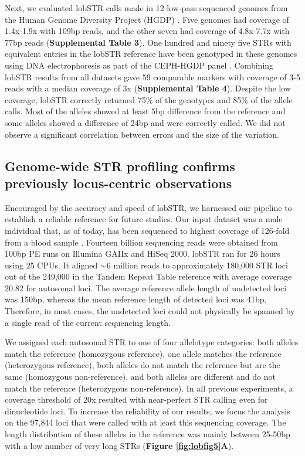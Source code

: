 Next, we evaluated lobSTR calls made in 12 low-pass sequenced genomes from the Human Genome Diversity Project (HGDP) \cite{GreenKrauseBriggsEtAl2010,ReichGreenKircherEtAl2010}. Five genomes had coverage of 1.4x-1.9x with 109bp reads, and the other seven had coverage of 4.8x-7.7x with 77bp reads (\textbf{Supplemental Table 3}). One hundred and ninety five STRs with equivalent entries in the lobSTR reference have been genotyped in these genomes using DNA electrophoresis as part of the CEPH-HGDP panel \cite{RamachandranDeshpandeRosemanEtAl2005,PembertonSandefurJakobssonEtAl2009}. Combining lobSTR results from all datasets gave 59 comparable markers with coverage of 3-5 reads with a median coverage of 3x (\textbf{Supplemental Table 4}). Despite the low coverage, lobSTR correctly returned 75\% of the genotypes and 85\% of the allele calls. Most of the alleles showed at least 5bp difference from the reference and some alleles showed a difference of 24bp and were correctly called. We did not observe a significant correlation between errors and the size of the variation. 

\subsection{Genome-wide STR profiling confirms previously locus-centric observations}
Encouraged by the accuracy and speed of lobSTR, we harnessed our pipeline to establish a reliable reference for future studies. Our input dataset was a male individual that, as of today, has been sequenced to highest coverage of 126-fold from a blood sample \cite{AjayParkerAbaanEtAl2011}. Fourteen billion sequencing reads were obtained from 100bp PE runs on Illumina GAIIx and HiSeq 2000. lobSTR ran for 26 hours using 25 CPUs. It aligned $\sim$6 million reads to approximately 180,000 STR loci out of the 249,000 in the Tandem Repeat Table reference with average coverage 20.82 for autosomal loci. The average reference allele length of undetected loci was 150bp, whereas the mean reference length of detected loci was 41bp. Therefore, in most cases, the undetected loci could not physically be spanned by a single read of the current sequencing length.

We assigned each autosomal STR to one of four allelotype categories: both alleles match the reference (homozygous reference), one allele matches the reference (heterozygous reference), both alleles do not match the reference but are the same (homozygous non-reference), and both alleles are different and do not match the reference (heterozygous non-reference). In all previous experiments, a coverage threshold of 20x resulted with near-perfect STR calling even for dinucleotide loci. To increase the reliability of our results, we focus the analysis on the 97,844 loci that were called with at least this sequencing coverage. The length distribution of these alleles in the reference was mainly between 25-50bp with a low number of very long STRs (\textbf{Figure \ref{fig:lobfig5}A}). 


